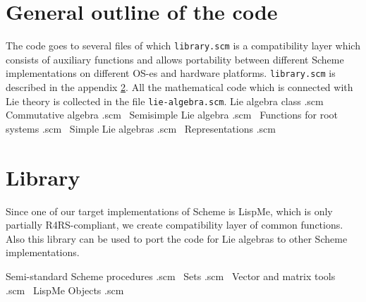 \documentclass[a4paper,10pt]{article}
\theoremstyle{definition} \newtheorem{Def}{Definition}
\begin{document}
            
\nwendcode{}\nwdocspar
\section{General outline of the code}
\label{sec:general-outline-code}

The code goes to several files of which {\tt{}library.scm} is a compatibility layer which consists of auxiliary functions and allows portability between different Scheme implementations on different OS-es and hardware platforms. {\tt{}library.scm} is described in the appendix \ref{sec:library}.
All the mathematical code which is connected with Lie theory is collected in the file {\tt{}lie-algebra.scm}.
\nwenddocs{}\endmoddef\let\nwnotused=\nwoutput{}
\LA{}Lie algebra class .scm~{\nwtagstyle{}}\RA{}
\LA{}Commutative algebra .scm~{\nwtagstyle{}}\RA{}
\LA{}Semisimple Lie algebra .scm~{\nwtagstyle{}}\RA{}
\LA{}Functions for root systems .scm~{\nwtagstyle{}}\RA{}
\LA{}Simple Lie algebras .scm~{\nwtagstyle{}}\RA{}
\LA{}Representations .scm~{\nwtagstyle{}}\RA{}
\nwnotused{lie-algebra.scm}\nwendcode{}\nwdocspar
\appendix

\section{Library}
\label{sec:library}
Since one of our target implementations of Scheme is LispMe, which is only partially R4RS-compliant, we create compatibility layer of common functions.
Also this library can be used to port the code for Lie algebras to other Scheme implementations.

\nwenddocs{}\endmoddef\let\nwnotused=\nwoutput{}
\LA{}Semi-standard Scheme procedures .scm~{\nwtagstyle{}}\RA{}
\LA{}Sets .scm~{\nwtagstyle{}}\RA{}
\LA{}Vector and matrix tools .scm~{\nwtagstyle{}}\RA{}
\LA{}LispMe Objects .scm~{\nwtagstyle{}}\RA{}
\nwnotused{library.scm}\nwendcode{}\nwdocspar
\end{document}
